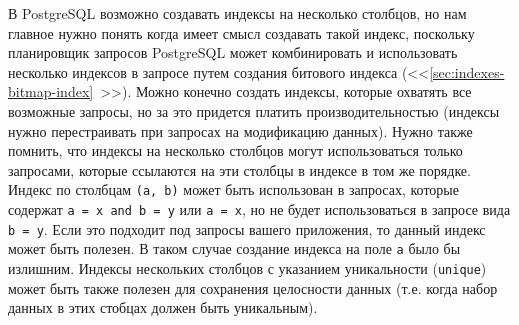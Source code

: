 В PostgreSQL возможно создавать индексы на несколько столбцов, но нам главное нужно понять когда имеет смысл создавать такой индекс, поскольку планировщик запросов PostgreSQL может комбинировать и использовать несколько индексов в запросе путем создания битового индекса (<<\ref{sec:indexes-bitmap-index}~>>). Можно конечно создать индексы, которые охватять все возможные запросы, но за это придется платить производительностью (индексы нужно перестраивать при запросах на модификацию данных). Нужно также помнить, что индексы на несколько столбцов могут использоваться только запросами, которые ссылаются на эти столбцы в индексе в том же порядке. Индекс по столбцам \lstinline!(a, b)! может быть использован в запросах, которые содержат \lstinline!a = x and b = y! или \lstinline!a = x!, но не будет использоваться в запросе вида \lstinline!b = y!. Если это подходит под запросы вашего приложения, то данный индекс может быть полезен. В таком случае создание индекса на поле \lstinline!a! было бы излишним. Индексы нескольких столбцов с указанием уникальности (\lstinline!unique!) может быть также полезен для сохранения целосности данных (т.е. когда набор данных в этих стобцах должен быть уникальным).


